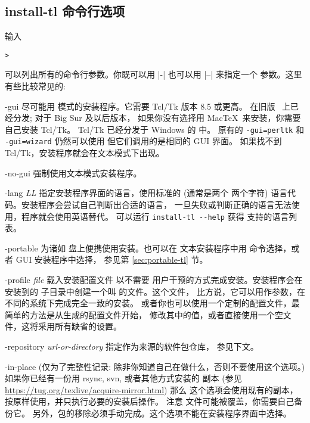 \documentclass{article}
\begin{document}
\subsection{install-tl 命令行选项}
\label{sec:cmdline}

输入
\begin{alltt}
> 
\end{alltt}
可以列出所有的命令行参数。你既可以用 |-| 也可以用 |--| 来指定一个
参数。这里有些比较常见的: 

\begin{ttdescription}
\item[-gui] 尽可能用 \GUI{} 模式的安装程序。它需要 Tcl/Tk 版本 8.5 或更高。
在旧版 \macOS{}\ 上已经分发; 对于 Big Sur 及以后版本，
如果你没有选择用 Mac\TeX\ 来安装，你需要自己安装 Tcl/Tk。
Tcl/Tk 已经分发于 Windows 的 \TL{} 中。
原有的 \texttt{-gui=perltk} 和 \texttt{-gui=wizard} 仍然可以使用
但它们调用的是相同的 GUI 界面。
如果找不到 Tcl/Tk，安装程序就会在文本模式下出现。

\item[-no-gui] 强制使用文本模式安装程序。

\item[-lang {\sl LL}] 指定安装程序界面的语言，使用标准的 (通常是两个
两个字符) 语言代码。安装程序会尝试自己判断出合适的语言，
一旦失败或判断正确的语言无法使用，程序就会使用英语替代。
可以运行 \verb|install-tl --help| 获得
支持的语言列表。

\item[-portable] 为诸如 \USB{} 盘上便携使用安装。也可以在
文本安装程序中用  命令选择，或者 GUI 安装程序中选择，
参见第 \ref{sec:portable-tl} 节。

\item[-profile {\sl file}] 载入安装配置文件  以不需要
用户干预的方式完成安装。安装程序会在安装到的 
子目录中创建一个叫  的文件。这个文件，
比方说，它可以用作参数，在不同的系统下完成完全一致的安装。
或者你也可以使用一个定制的配置文件，最简单的方法是从生成的配置文件开始，
修改其中的值，或者直接使用一个空文件，这将采用所有缺省的设置。

\item [-repository {\sl url-or-directory}] 指定作为来源的软件包仓库，
参见下文。

\item[-in-place] (仅为了完整性记录: 除非你知道自己在做什么，否则不要使用这个选项。)
如果你已经有一份用 rsync, svn, 或者其他方式安装的
\TL{} 副本 (参见 \url{https://tug.org/texlive/acquire-mirror.html}) 那么
这个选项会使用现有的副本，按原样使用，并只执行必要的安装后操作。
注意  文件可能被覆盖，你需要自己备份它。
另外，包的移除必须手动完成。这个选项不能在安装程序界面中选择。
\end{ttdescription}
\end{document}
